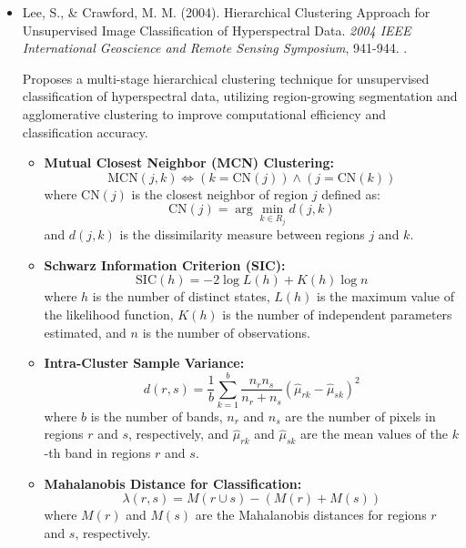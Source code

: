 \documentclass[10pt,svgnames,fragile]{beamer}
\begin{document}
\begin{frame}{}
\tiny
\begin{itemize}

    \item Lee, S., \& Crawford, M. M. (2004). Hierarchical Clustering Approach for Unsupervised Image Classification of Hyperspectral Data. \textit{2004 IEEE International Geoscience and Remote Sensing Symposium}, 941-944. \href{https://doi.org/10.1109/IGARSS.2004.1370751}{\color{blue}{DOI: 10.1109/IGARSS.2004.1370751}}. \cite{sanghoonleeHierarchicalClusteringApproach2004}
    
    {\color{gray}Proposes a multi-stage hierarchical clustering technique for unsupervised classification of hyperspectral data, utilizing region-growing segmentation and agglomerative clustering to improve computational efficiency and classification accuracy.}
    \begin{itemize} \tiny
    \item \textbf{Mutual Closest Neighbor (MCN) Clustering:}
    \[
    \text{MCN}(j, k) \iff \left( k = \text{CN}(j) \right) \land \left( j = \text{CN}(k) \right)
    \]
    where \( \text{CN}(j) \) is the closest neighbor of region \( j \) defined as:
    \[
    \text{CN}(j) = \arg \min_{k \in R_j} d(j, k)
    \]
    and \( d(j, k) \) is the dissimilarity measure between regions \( j \) and \( k \).

    \item \textbf{Schwarz Information Criterion (SIC):}
    \[
    \text{SIC}(h) = -2 \log L(h) + K(h) \log n
    \]
    where \( h \) is the number of distinct states, \( L(h) \) is the maximum value of the likelihood function, \( K(h) \) is the number of independent parameters estimated, and \( n \) is the number of observations.

    \item \textbf{Intra-Cluster Sample Variance:}
    \[
    d(r, s) = \frac{1}{b} \sum_{k=1}^{b} \frac{n_r n_s}{n_r + n_s} \left( \hat{\mu}_{rk} - \hat{\mu}_{sk} \right)^2
    \]
    where \( b \) is the number of bands, \( n_r \) and \( n_s \) are the number of pixels in regions \( r \) and \( s \), respectively, and \( \hat{\mu}_{rk} \) and \( \hat{\mu}_{sk} \) are the mean values of the \( k \)-th band in regions \( r \) and \( s \).

    \item \textbf{Mahalanobis Distance for Classification:}
    \[
    \lambda(r, s) = M(r \cup s) - (M(r) + M(s))
    \]
    where \( M(r) \) and \( M(s) \) are the Mahalanobis distances for regions \( r \) and \( s \), respectively.
    \end{itemize}

\end{itemize}
\end{frame}
\end{document}
